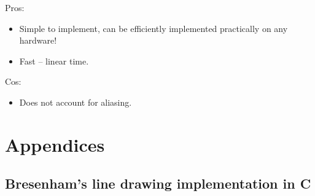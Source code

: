 \documentclass[a4paper]{article}
\begin{document}
Pros:
\begin{itemize}
	\item Simple to implement, can be efficiently implemented practically on any hardware!
	\item Fast -- linear time.
\end{itemize}
Cos:
\begin{itemize}
	\item Does not account for aliasing.
\end{itemize}

\newpage
\printbibliography



\newpage
\appendix

\section{Appendices}

\newpage
\subsection{Bresenham's line drawing implementation in C}
\label{app:bresenham_full}


\end{document}
